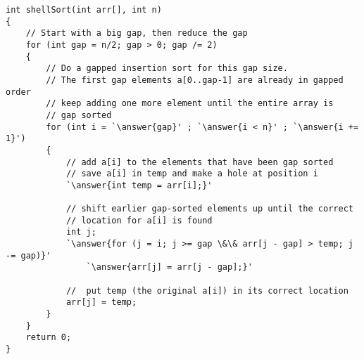 \documentclass[10pt,a4paper]{article}
\begin{document}
\begin{lstlisting}
int shellSort(int arr[], int n)
{
    // Start with a big gap, then reduce the gap
    for (int gap = n/2; gap > 0; gap /= 2)
    {
        // Do a gapped insertion sort for this gap size.
        // The first gap elements a[0..gap-1] are already in gapped order
        // keep adding one more element until the entire array is
        // gap sorted 
        for (int i = `\answer{gap}' ; `\answer{i < n}' ; `\answer{i += 1}')
        {
            // add a[i] to the elements that have been gap sorted
            // save a[i] in temp and make a hole at position i
            `\answer{int temp = arr[i];}'
 
            // shift earlier gap-sorted elements up until the correct 
            // location for a[i] is found
            int j;            
            `\answer{for (j = i; j >= gap \&\& arr[j - gap] > temp; j -= gap)}'
                `\answer{arr[j] = arr[j - gap];}'
             
            //  put temp (the original a[i]) in its correct location
            arr[j] = temp;
        }
    }
    return 0;
}
\end{lstlisting}


\end{document}
